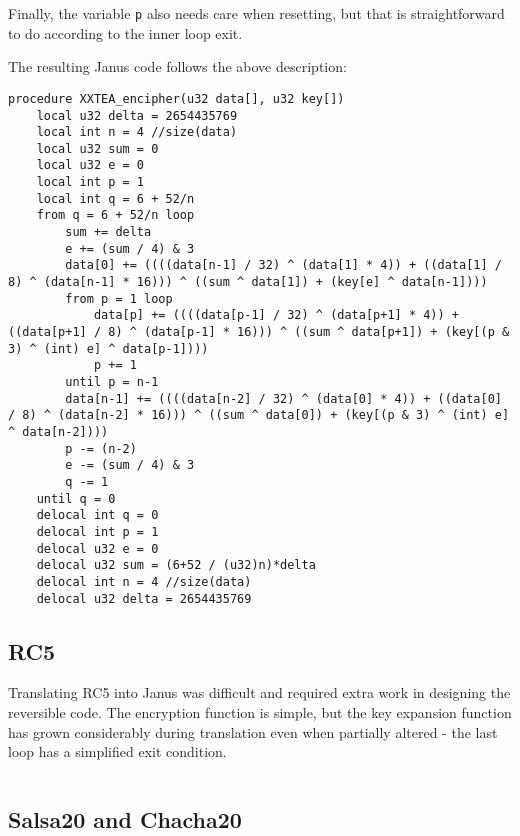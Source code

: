 \documentclass[a4paper,10pt,openright]{memoir}
\newcommand{\code}[1]{\texttt{#1}}
\begin{document}
Finally, the variable \code{p} also needs care when resetting, but that 
is straightforward to do according to the inner loop exit.

The resulting Janus code follows the above description:

\begin{lstlisting}
procedure XXTEA_encipher(u32 data[], u32 key[])
    local u32 delta = 2654435769
    local int n = 4 //size(data)
    local u32 sum = 0
    local u32 e = 0
    local int p = 1
    local int q = 6 + 52/n
    from q = 6 + 52/n loop
        sum += delta
        e += (sum / 4) & 3
        data[0] += ((((data[n-1] / 32) ^ (data[1] * 4)) + ((data[1] / 8) ^ (data[n-1] * 16))) ^ ((sum ^ data[1]) + (key[e] ^ data[n-1])))
        from p = 1 loop
            data[p] += ((((data[p-1] / 32) ^ (data[p+1] * 4)) + ((data[p+1] / 8) ^ (data[p-1] * 16))) ^ ((sum ^ data[p+1]) + (key[(p & 3) ^ (int) e] ^ data[p-1])))
            p += 1
        until p = n-1
        data[n-1] += ((((data[n-2] / 32) ^ (data[0] * 4)) + ((data[0] / 8) ^ (data[n-2] * 16))) ^ ((sum ^ data[0]) + (key[(p & 3) ^ (int) e] ^ data[n-2])))
        p -= (n-2)
        e -= (sum / 4) & 3
        q -= 1
    until q = 0
    delocal int q = 0
    delocal int p = 1
    delocal u32 e = 0
    delocal u32 sum = (6+52 / (u32)n)*delta
    delocal int n = 4 //size(data)
    delocal u32 delta = 2654435769
\end{lstlisting}

\subsection{RC5}

Translating RC5 into Janus was difficult and required extra work in 
designing the reversible code. The encryption function is simple, but 
the key expansion function has grown considerably during translation 
even when partially altered - the last loop has a simplified exit 
condition.


\begin{lstlisting}
\end{lstlisting}

\subsection{Salsa20 and Chacha20}
\label{sec:impl:salsa}
\end{document}
